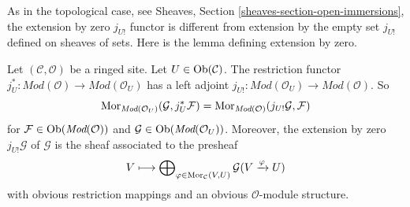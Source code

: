 \noindent
As in the topological case, see
Sheaves, Section \ref{sheaves-section-open-immersions},
the extension by zero $j_{U!}$ functor is different from
extension by the empty set $j_{U!}$ defined on sheaves of sets.
Here is the lemma defining extension by zero.

\begin{lemma}
\label{lemma-extension-by-zero}
Let $(\mathcal{C}, \mathcal{O})$ be a ringed site.
Let $U \in \mathop{\mathrm{Ob}}\nolimits(\mathcal{C})$.
The restriction functor
$j_U^* : \textit{Mod}(\mathcal{O}) \to \textit{Mod}(\mathcal{O}_U)$
has a left adjoint
$j_{U!} : \textit{Mod}(\mathcal{O}_U) \to \textit{Mod}(\mathcal{O})$.
So
$$
\mathop{\mathrm{Mor}}\nolimits_{\textit{Mod}(\mathcal{O}_U)}(\mathcal{G}, j_U^*\mathcal{F})
=
\mathop{\mathrm{Mor}}\nolimits_{\textit{Mod}(\mathcal{O})}(j_{U!}\mathcal{G}, \mathcal{F})
$$
for $\mathcal{F} \in \mathop{\mathrm{Ob}}\nolimits(\textit{Mod}(\mathcal{O}))$
and $\mathcal{G} \in \mathop{\mathrm{Ob}}\nolimits(\textit{Mod}(\mathcal{O}_U))$.
Moreover, the extension by zero $j_{U!}\mathcal{G}$ of $\mathcal{G}$
is the sheaf associated to the presheaf
$$
V
\longmapsto
\bigoplus\nolimits_{\varphi \in \mathop{\mathrm{Mor}}\nolimits_\mathcal{C}(V, U)}
\mathcal{G}(V \xrightarrow{\varphi} U)
$$
with obvious restriction mappings and an obvious $\mathcal{O}$-module
structure.
\end{lemma}

